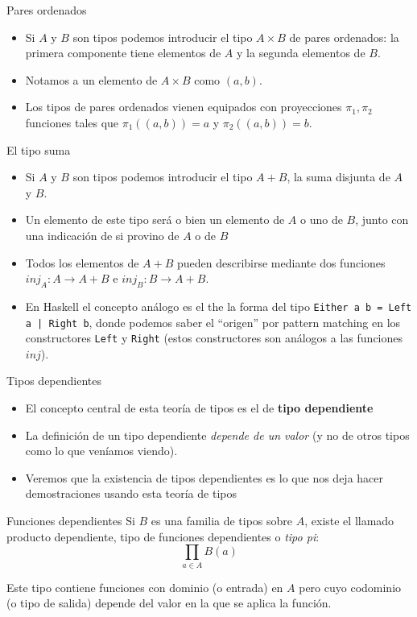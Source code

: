 \documentclass[11pt]{beamer}
\newcommand{\bit}{\begin{itemize}\setlength\itemsep{1em}}
\newcommand{\eit}{\end{itemize}}
\begin{document}
\begin{frame}{Pares ordenados}
\bit

\item Si $A$ y $B$ son tipos podemos introducir el tipo $A \times B$ de pares ordenados: la primera componente tiene elementos de $A$ y la segunda elementos de $B$.
\item Notamos a un elemento de $A \times B$ como $(a,b)$.
\item Los tipos de pares ordenados vienen equipados con proyecciones $\pi_1, \pi_2$ funciones tales que $\pi_1 ((a,b)) = a$ y $\pi_2 ((a,b)) = b$.
\eit
\end{frame}

\begin{frame}{El tipo suma}
\bit
\item Si $A$ y $B$ son tipos podemos introducir el tipo $A + B$, la suma disjunta de $A$ y $B$. 
\item Un elemento de este tipo será o bien un elemento de $A$ o uno de $B$, junto con una indicación de si provino de $A$ o de $B$
\item Todos los elementos de $A + B$ pueden describirse mediante dos funciones $inj_A : A \rightarrow A + B$ e $inj_B : B \rightarrow A + B$. 
\item En Haskell el concepto análogo es el the la forma del tipo \texttt{Either a b = Left a | Right b}, donde podemos saber el ``origen'' por pattern matching en los constructores \texttt{Left} y \texttt{Right} (estos constructores son análogos a las funciones $inj$). 
\eit
\end{frame}

\begin{frame}{Tipos dependientes}
\bit
\item El concepto central de esta teoría de tipos es el de \textbf{tipo dependiente}
\item La definición de un tipo dependiente \textit{depende de un valor} (y no de otros tipos como lo que veníamos viendo).
\item Veremos que la existencia de tipos dependientes es lo que nos deja hacer demostraciones usando esta teoría de tipos
\eit
\end{frame}


\begin{frame}{Funciones dependientes}
Si $B$ es una familia de tipos sobre $A$, existe el llamado producto dependiente, tipo de funciones dependientes o \textit{tipo pi}:
\[ \prod_{a\in A}B(a)
    \]

Este tipo contiene funciones con dominio (o entrada) en $A$ pero cuyo codominio (o tipo de salida) depende del valor en la que se aplica la función. 

\end{frame}
\end{document}
